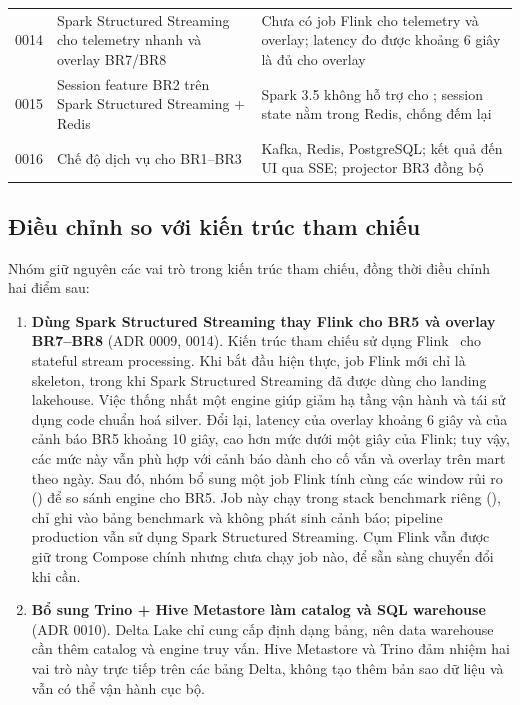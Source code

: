 {\begin{longtable}{@{}L{0.9cm}L{4.6cm}L{9.0cm}@{}}
0014 & Spark Structured Streaming cho telemetry nhanh và overlay BR7/BR8 & Chưa có job Flink cho telemetry và overlay; latency đo được khoảng 6 giây là đủ cho overlay \\
0015 & Session feature BR2 trên Spark Structured Streaming + Redis & Spark 3.5 không hỗ trợ  cho ; session state nằm trong Redis,  chống đếm lại \\
0016 & Chế độ dịch vụ cho BR1--BR3 & Kafka, Redis, PostgreSQL; kết quả đến UI qua SSE; projector BR3 đồng bộ  \\
\bottomrule
\end{longtable}}

\subsection{Điều chỉnh so với kiến trúc tham chiếu}
\label{sec:deviations}

Nhóm giữ nguyên các vai trò trong kiến trúc tham chiếu, đồng thời điều chỉnh hai điểm sau:

\begin{enumerate}
  \item \textbf{Dùng Spark Structured Streaming thay Flink cho BR5 và overlay BR7--BR8} (ADR 0009, 0014). Kiến trúc tham chiếu sử dụng Flink~\cite{carbone2015flink} cho stateful stream processing. Khi bắt đầu hiện thực, job Flink mới chỉ là skeleton, trong khi Spark Structured Streaming đã được dùng cho landing lakehouse. Việc thống nhất một engine giúp giảm hạ tầng vận hành và tái sử dụng code chuẩn hoá silver. Đổi lại, latency của overlay khoảng 6 giây và của cảnh báo BR5 khoảng 10 giây, cao hơn mức dưới một giây của Flink; tuy vậy, các mức này vẫn phù hợp với cảnh báo dành cho cố vấn và overlay trên mart theo ngày. Sau đó, nhóm bổ sung một job Flink tính cùng các window rủi ro () để so sánh engine cho BR5. Job này chạy trong stack benchmark riêng (), chỉ ghi vào bảng benchmark và không phát sinh cảnh báo; pipeline production vẫn sử dụng Spark Structured Streaming. Cụm Flink vẫn được giữ trong Compose chính nhưng chưa chạy job nào, để sẵn sàng chuyển đổi khi cần.
  \item \textbf{Bổ sung Trino + Hive Metastore làm catalog và SQL warehouse} (ADR 0010). Delta Lake chỉ cung cấp định dạng bảng, nên data warehouse cần thêm catalog và engine truy vấn. Hive Metastore và Trino đảm nhiệm hai vai trò này trực tiếp trên các bảng Delta, không tạo thêm bản sao dữ liệu và vẫn có thể vận hành cục bộ.
\end{enumerate}
